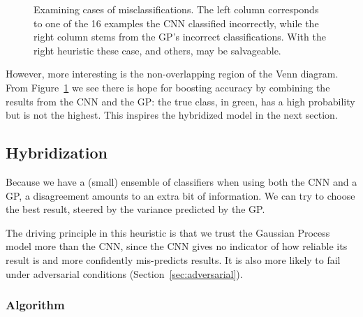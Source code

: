 \documentclass{article}
\begin{document}
\begin{figure}[htb]
\begin{minipage}[c]{.49\hsize}
\end{minipage} %
\caption{Examining cases of misclassifications. The left column corresponds to one of the 16 examples the CNN classified incorrectly, while the right column stems from the GP's incorrect classifications. With the right heuristic these case, and others, may be salvageable.}
\label{fig:mnist:mismatch}
\end{figure}

However, more interesting is the non-overlapping region of the Venn diagram. From Figure~\ref{fig:mnist:mismatch} we see there is hope for boosting accuracy by combining the results from the CNN and the GP: the true class, in green, has a high probability but is not the highest. This inspires the hybridized model in the next section.


\subsection{Hybridization}
\label{sec:mnist:hybridization}

Because we have a (small) ensemble of classifiers when using both the CNN and a GP, a disagreement amounts to an extra bit of information. We can try to choose the best result, steered by the variance predicted by the GP.

The driving principle in this heuristic is that we trust the Gaussian Process model more than the CNN, since the CNN gives no indicator of how reliable its result is and more confidently mis-predicts results. It is also more likely to fail under adversarial conditions (Section~\ref{sec:adversarial}).

\subsubsection{Algorithm}
\label{sec:mnist:hybridization:criteria}
\end{document}

